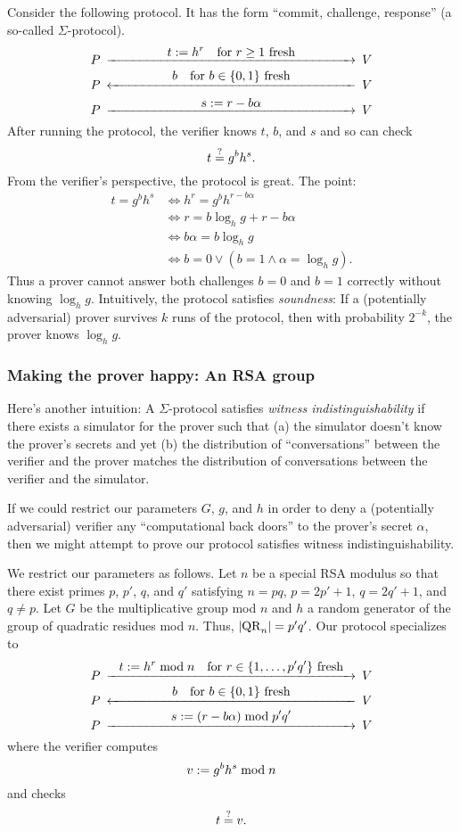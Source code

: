 Consider the following protocol. It has the form ``commit,
challenge, response'' (a so-called $\Sigma$-protocol).
\[
	\minCDarrowwidth200pt
	\begin{CD}
	P	@>{\displaystyle t \defeq h^r	\quad\text{for $r \ge 1$ fresh}}>>	V \\
	P	@<{\displaystyle b	\quad\text{for $b \in \sset{0, 1}$ fresh}}<<	V \\
	P	@>{\displaystyle s \defeq r - b\alpha}>>	V
	\end{CD}
\]
After running the protocol, the verifier knows $t$, $b$, and $s$
and so can check
$$
	t \mathrel{\overset{\mathrm{?}}{=}} g^b h^s.
$$
From the verifier's perspective, the protocol is great. The
point:
\begin{align*}
	t = g^b h^s &\iff h^r = g^b h^{r - b\alpha} \\
	&\iff r = b \log_h g + r - b\alpha \\
	&\iff b\alpha = b \log_h g \\
	&\iff b = 0 \lor (b = 1 \land \alpha = \log_h g).
\end{align*}
Thus a prover cannot answer both challenges $b = 0$ and $b = 1$
correctly without knowing $\log_h g$. Intuitively, the protocol
satisfies \emph{soundness}: If a (potentially adversarial) prover
survives $k$ runs of the protocol, then with probability $2^{-k}$,
the prover knows $\log_h g$.

\subsubsection{Making the prover happy: An RSA group}

Here's another intuition: A $\Sigma$-protocol satisfies \emph{witness
indistinguishability} if there exists a simulator for the
prover such that (a) the simulator doesn't know the prover's
secrets and yet (b) the distribution of ``conversations''
between the verifier and the prover matches the distribution
of conversations between the verifier and the simulator.

If we could restrict our parameters $G$, $g$, and $h$ in order to
deny a (potentially adversarial) verifier any ``computational
back doors'' to the prover's secret $\alpha$, then we might attempt to
prove our protocol satisfies witness
indistinguishability.

\newcommand{\size}[1]{\lvert{#1}\rvert}
We restrict our parameters as follows.
Let $n$ be a special RSA modulus so that
there exist primes $p$, $p'$, $q$, and $q'$ satisfying
$n = pq$, $p = 2p' + 1$, $q = 2q' + 1$, and $q \not= p$.
Let $G$ be the multiplicative group mod $n$
and $h$ a random generator of the group of quadratic
residues mod $n$.
Thus, $\size{\QR_n} = p'q'$. Our protocol specializes to
\[
	\minCDarrowwidth200pt
	\begin{CD}
	P	@>{\displaystyle t \defeq h^r \bmod n	\quad\text{for $r \in \sset{1, \ldots, p'q'}$ fresh}}>>	V \\
	P	@<{\displaystyle b	\quad\text{for $b \in \sset{0, 1}$ fresh}}<<	V \\
	P	@>{\displaystyle s \defeq (r - b\alpha) \bmod p'q'}>>	V
	\end{CD}
\]
where the verifier computes
\[
	v \mathrel{:=} g^b h^s \bmod n
\]
and checks
\[
	t \mathrel{\overset{\mathrm{?}}{=}} v.
\]

